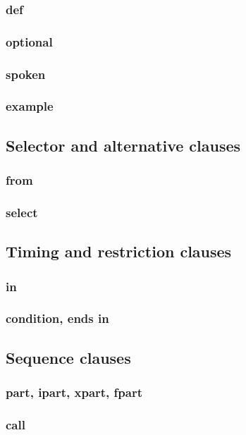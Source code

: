\documentclass[12pt]{article}
\begin{document}
\subsubsection{def}
\subsubsection{optional}
\subsubsection{spoken}
\subsubsection{example}

\subsection{Selector and alternative clauses}
\subsubsection{from}
\subsubsection{select}

\subsection{Timing and restriction clauses}
\subsubsection{in}
\subsubsection{condition, ends in}

\subsection{Sequence clauses}
\subsubsection{part, ipart, xpart, fpart}
\subsubsection{call}
\end{document}
